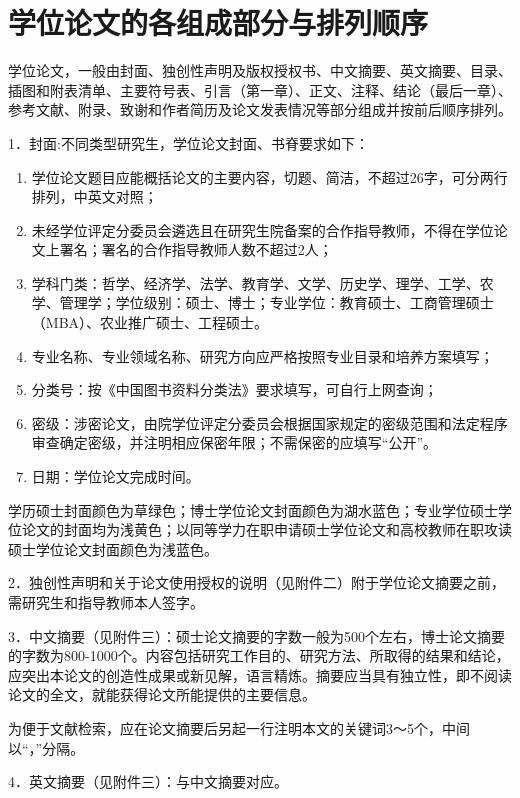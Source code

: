 \section{学位论文的各组成部分与排列顺序}

学位论文，一般由封面、独创性声明及版权授权书、中文摘要、英文摘要、目录、插图和附表清单、主要符号表、引言（第一章）、正文、注释、结论（最后一章）、参考文献、附录、致谢和作者简历及论文发表情况等部分组成并按前后顺序排列。

1．封面:不同类型研究生，学位论文封面、书脊要求如下：

\begin{enumerate}[label =（\arabic*）]
	\item 学位论文题目应能概括论文的主要内容，切题、简洁，不超过26字，可分两行排列，中英文对照；
	\item 未经学位评定分委员会遴选且在研究生院备案的合作指导教师，不得在学位论文上署名；署名的合作指导教师人数不超过2人；
	\item 学科门类：哲学、经济学、法学、教育学、文学、历史学、理学、工学、农学、管理学；学位级别：硕士、博士；专业学位：教育硕士、工商管理硕士（MBA）、农业推广硕士、工程硕士。
	\item 专业名称、专业领域名称、研究方向应严格按照专业目录和培养方案填写；
	\item 分类号：按《中国图书资料分类法》要求填写，可自行上网查询；
	\item 密级：涉密论文，由院学位评定分委员会根据国家规定的密级范围和法定程序审查确定密级，并注明相应保密年限；不需保密的应填写“公开”。
	\item 日期：学位论文完成时间。
\end{enumerate}

学历硕士封面颜色为草绿色；博士学位论文封面颜色为湖水蓝色；专业学位硕士学位论文的封面均为浅黄色；以同等学力在职申请硕士学位论文和高校教师在职攻读硕士学位论文封面颜色为浅蓝色。

2．独创性声明和关于论文使用授权的说明（见附件二）附于学位论文摘要之前，需研究生和指导教师本人签字。

3．中文摘要（见附件三）：硕士论文摘要的字数一般为500个左右，博士论文摘要的字数为800-1000个。内容包括研究工作目的、研究方法、所取得的结果和结论，应突出本论文的创造性成果或新见解，语言精炼。摘要应当具有独立性，即不阅读论文的全文，就能获得论文所能提供的主要信息。

为便于文献检索，应在论文摘要后另起一行注明本文的关键词3～5个，中间以“，”分隔。

4．英文摘要（见附件三）：与中文摘要对应。


